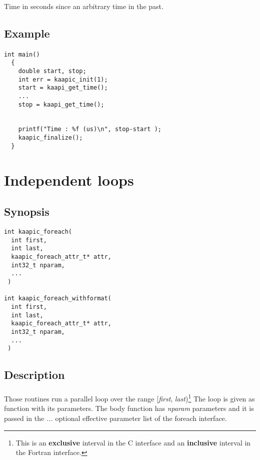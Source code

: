 \documentclass[a4paper, 11pt]{article}
\begin{document}
\paragraph{}
Time in seconds since an arbitrary time in the past.

\subsection{Example}
\paragraph{}
\begin{small}
\begin{lstlisting}[frame=tb]
  int main()
  {
    double start, stop;
    int err = kaapic_init(1);
    start = kaapi_get_time(); 
    ...
    stop = kaapi_get_time(); 


    printf("Time : %f (us)\n", stop-start );
    kaapic_finalize();
  }
\end{lstlisting}
\end{small}


\newpage
\section{Independent loops}

\subsection{Synopsis}
\begin{small}
\lstset{language=C}
\begin{lstlisting}[frame=tb]
int kaapic_foreach( 
  int first, 
  int last,
  kaapic_foreach_attr_t* attr,
  int32_t nparam,
  ...
 ) 

int kaapic_foreach_withformat( 
  int first, 
  int last,
  kaapic_foreach_attr_t* attr,
  int32_t nparam,
  ...
 ) 
\end{lstlisting}
\end{small}

\subsection{Description}
\paragraph{}
Those routines run a parallel loop over the range [\textit{first}, \textit{last})\footnote{
This is an \textbf{exclusive} interval in the C interface and an \textbf{inclusive} interval in the Fortran interface.}
The loop is given as function with its parameters. The body function has \textit{nparam} parameters and it is 
passed in the \textit{...} optional effective parameter list of the foreach interface.
\end{document}
